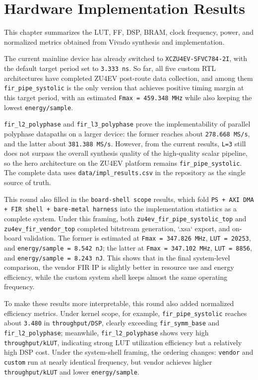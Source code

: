 \section{Hardware Implementation Results}

This chapter summarizes the LUT, FF, DSP, BRAM, clock frequency, power, and normalized metrics obtained from Vivado synthesis and implementation.

The current mainline device has already switched to \texttt{XCZU4EV-SFVC784-2I}, with the default target period set to \texttt{3.333 ns}. So far, all five custom RTL architectures have completed ZU4EV post-route data collection, and among them \texttt{fir\_pipe\_systolic} is the only version that achieves positive timing margin at this target period, with an estimated \texttt{Fmax = 459.348 MHz} while also keeping the lowest \texttt{energy/sample}.

\texttt{fir\_l2\_polyphase} and \texttt{fir\_l3\_polyphase} prove the implementability of parallel polyphase datapaths on a larger device: the former reaches about \texttt{278.668 MS/s}, and the latter about \texttt{381.388 MS/s}. However, from the current results, \texttt{L=3} still does not surpass the overall synthesis quality of the high-quality scalar pipeline, so the hero architecture on the ZU4EV platform remains \texttt{fir\_pipe\_systolic}. The complete data uses \texttt{data/impl\_results.csv} in the repository as the single source of truth.

This round also filled in the \texttt{board-shell scope} results, which fold \texttt{PS + AXI DMA + FIR shell + bare-metal harness} into the implementation statistics as a complete system. Under this framing, both \texttt{zu4ev\_fir\_pipe\_systolic\_top} and \texttt{zu4ev\_fir\_vendor\_top} completed bitstream generation, `.xsa` export, and on-board validation. The former is estimated at \texttt{Fmax = 347.826 MHz}, \texttt{LUT = 20253}, and \texttt{energy/sample = 8.542 nJ}; the latter at \texttt{Fmax = 347.102 MHz}, \texttt{LUT = 8856}, and \texttt{energy/sample = 8.243 nJ}. This shows that in the final system-level comparison, the vendor FIR IP is slightly better in resource use and energy efficiency, while the custom system shell keeps almost the same operating frequency.

To make these results more interpretable, this round also added normalized efficiency metrics. Under kernel scope, for example, \texttt{fir\_pipe\_systolic} reaches about \texttt{3.480} in \texttt{throughput/DSP}, clearly exceeding \texttt{fir\_symm\_base} and \texttt{fir\_l2\_polyphase}; meanwhile, \texttt{fir\_l2\_polyphase} shows very high \texttt{throughput/kLUT}, indicating strong LUT utilization efficiency but a relatively high DSP cost. Under the system-shell framing, the ordering changes: \texttt{vendor} and \texttt{custom} run at nearly identical frequency, but vendor achieves higher \texttt{throughput/kLUT} and lower \texttt{energy/sample}.

